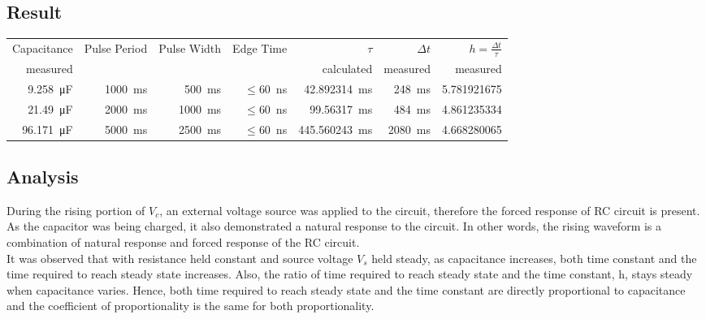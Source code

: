 \documentclass{article}
\begin{document}
\subsection*{Result}
\begin{table}[H]
\centering
    \begin{tabular}{@{}r r r r r r r@{}}
         \toprule
         Capacitance & Pulse Period & Pulse Width  & Edge Time & $\tau$& $\Delta t$ & $h=\frac{\Delta t}{\tau}$\\
         measured & & & & calculated & measured & measured  \\
         \midrule
        \SI{9.258}{\micro\farad}& \SI{1000}{\milli\second} & \SI{500}{\milli\second} & $\leq$\SI{60}{\nano\second} & \SI{42.892314}{\milli\second} & \SI{248}{\milli\second} & 5.781921675 \\
        \SI{21.49}{\micro\farad}& \SI{2000}{\milli\second} & \SI{1000}{\milli\second} & $\leq$\SI{60}{\nano\second} & \SI{99.56317}{\milli\second}& \SI{484}{\milli\second} & 4.861235334 \\
        \SI{96.171}{\micro\farad}& \SI{5000}{\milli\second} & \SI{2500}{\milli\second} & $\leq$\SI{60}{\nano\second} & \SI{445.560243}{\milli\second} & \SI{2080}{\milli\second} & 4.668280065 \\
         \bottomrule
    \end{tabular}
\end{table}


\subsection*{Analysis}
During the rising portion of $V_c$, an external voltage source was applied to the circuit, therefore the forced response of RC circuit is present. As the capacitor was being charged, it also demonstrated a natural response to the circuit. In other words, the rising waveform is a combination of natural response and forced response of the RC circuit.\\
It was observed that with resistance held constant and source voltage $V_s$ held steady, as capacitance increases, both time constant and the time required to reach steady state increases. Also, the ratio of time required to reach steady state and the time constant, h, stays steady when capacitance varies. Hence, both time required to reach steady state and the time constant are directly proportional to capacitance and the coefficient of proportionality is the same for both proportionality.
\end{document}

